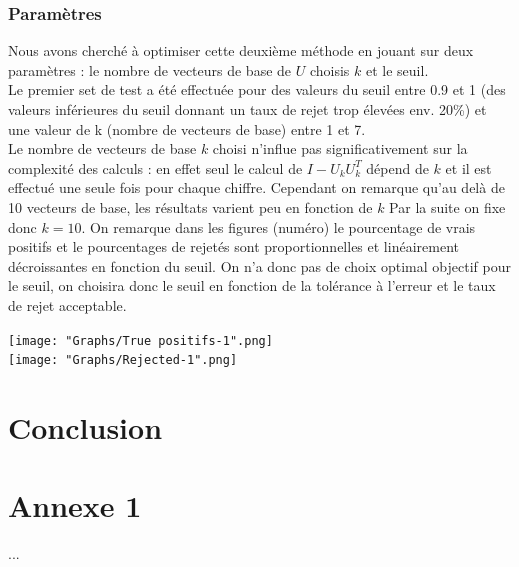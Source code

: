 \documentclass[a4paper,11pt,twoside]{report}
\begin{document}
\subsection{Paramètres}
Nous avons cherché à optimiser cette deuxième méthode en jouant sur deux paramètres : le nombre de vecteurs de base de $U$ choisis $k$ et le seuil.\\

Le premier set de test a été effectuée pour des valeurs du seuil entre 0.9 et 1 (des valeurs inférieures du seuil donnant un taux de rejet trop élevées env. 20\%) et une valeur de k (nombre de vecteurs de base) entre 1 et 7.\\


Le nombre de vecteurs de base $k$ choisi n'influe pas significativement sur la complexité des calculs : en effet seul le calcul de $I-U_{k}U_{k}^{T}$ dépend de $k$ et il est effectué une seule fois pour chaque chiffre. Cependant on remarque qu'au delà de 10 vecteurs de base, les résultats varient peu en fonction de $k$ %
Par la suite on fixe donc $k=10$.
On remarque dans les figures (numéro) le pourcentage de vrais positifs et le pourcentages de rejetés sont proportionnelles et linéairement décroissantes en fonction du seuil. On n'a donc pas de choix optimal objectif pour le seuil, on choisira donc le seuil en fonction de la tolérance à l'erreur et le taux de rejet acceptable. 

%



\texttt{[image: "Graphs/True positifs-1".png]} \\

\texttt{[image: "Graphs/Rejected-1".png]} \\




\chapter{Conclusion}

  
\nocite{*} 

%
\cleardoublepage

\appendix

\chapter{Annexe 1}
...
\end{document}
